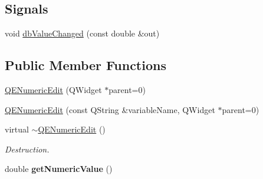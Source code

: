 \subsection*{Signals}
\begin{DoxyCompactItemize}
\item 
void \hyperlink{classQENumericEdit_a8126ea52eefb6613e06109a12003621e}{dbValueChanged} (const double \&out)
\end{DoxyCompactItemize}
\subsection*{Public Member Functions}
\begin{DoxyCompactItemize}
\item 
\hyperlink{classQENumericEdit_ab43a0c2bc70d13d8e01cb9d9a14cabf7}{QENumericEdit} (QWidget $\ast$parent=0)
\item 
\hyperlink{classQENumericEdit_a33d4a3b18bc0c55a533155bc625fd567}{QENumericEdit} (const QString \&variableName, QWidget $\ast$parent=0)
\item 
\hypertarget{classQENumericEdit_ad85eeaf0b4fe46addafa0ed812fcb367}{
virtual \hyperlink{classQENumericEdit_ad85eeaf0b4fe46addafa0ed812fcb367}{$\sim$QENumericEdit} ()}
\label{classQENumericEdit_ad85eeaf0b4fe46addafa0ed812fcb367}

\begin{DoxyCompactList}\small\item\em Destruction. \end{DoxyCompactList}\item 
\hypertarget{classQENumericEdit_a23a924d1ca4b23c279991391af45df72}{
double {\bfseries getNumericValue} ()}
\label{classQENumericEdit_a23a924d1ca4b23c279991391af45df72}

\end{DoxyCompactItemize}
